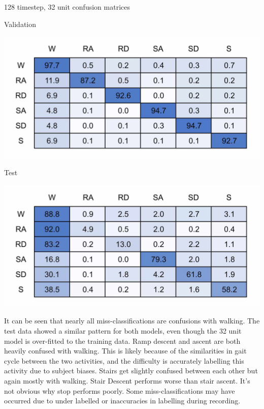 \documentclass[sensors,article,submit,moreauthors,pdftex]{Definitions/mdpi}
\begin{document}
\begin{table}[!hbt]
    \centering
    \caption{128 timestep, 32 unit confusion matrices}
    \label{tab:128x32_full_model_confusion_matrix}
    \begin{subtable}{.45\textwidth}
        \centering
        \caption{Validation}
        \label{tab:full_model_conf_matrix_training_128x32}
        \includegraphics[width=\textwidth]{Figures/results/conf_matricies/Training_128x32_NT.jpg}
    \end{subtable}
    \hfil
    \begin{subtable}{.45\textwidth}
        \centering
        \caption{Test}
        \label{tab:full_model_conf_matrix_test_128x32}
        \includegraphics[width=\textwidth]{Figures/results/conf_matricies/Test_128x32_NT.jpg}
    \end{subtable}
\end{table}

It can be seen that nearly all miss-classifications are confusions with walking. The test data showed a similar pattern for both models, even though the 32 unit model is over-fitted to the training data. Ramp descent and ascent are both heavily confused with walking. This is likely because of the similarities in gait cycle between the two activities, and the difficulty is accurately labelling this activity due to subject biases. Stairs get slightly confused between each other but again mostly with walking. Stair Descent performs worse than stair ascent. It's not obvious why stop performs poorly. Some miss-classifications may have occurred due to under labelled or inaccuracies in labelling during recording.
\end{document}
